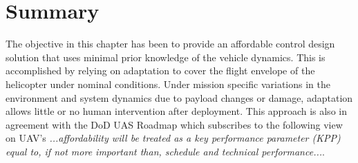 \documentclass[12pt]{article}
\begin{document}





\section{Summary}
The objective in this chapter has been to provide an affordable control design solution that uses minimal prior knowledge of the vehicle dynamics. This is accomplished by relying on adaptation to cover the flight envelope of the helicopter under nominal conditions. Under mission specific variations in the environment and system dynamics due to payload changes or damage, adaptation allows little or no human intervention after deployment. This approach is also in agreement with the DoD UAS Roadmap which subscribes to the following view on UAV's \emph{...affordability will be treated as a key performance parameter (KPP) equal to, if not more important than, schedule and technical performance...}.

\appendix

%



\end{document}
